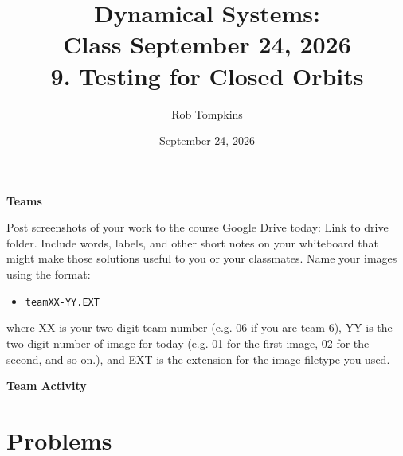 \documentclass[12pt]{amsart}
\title{Dynamical Systems:\\Class September 24, 2026\\ 9. Testing for Closed Orbits}
\author{Rob Tompkins}
\date{September 24, 2026}
\theoremstyle{plain}
\theoremstyle{definition}
\theoremstyle{definition}
\theoremstyle{plain}
\begin{document}
    \maketitle
    {\large\bfseries Teams}

    Post screenshots of your work to the course Google Drive today: Link to drive folder. Include words, labels, and other short notes on your whiteboard that might make those solutions useful to you or your classmates. Name your images using the format:
    \begin{itemize}
        \item \texttt{teamXX-YY.EXT}
    \end{itemize}
    where XX is your two-digit team number (e.g. 06 if you are team 6), YY is the two digit number of image for today (e.g. 01 for the first image, 02 for the second, and so on.), and EXT is the extension for the image filetype you used.

    \par\medskip
    {\large\bfseries Team Activity}

    \section*{Problems}
\end{document}
